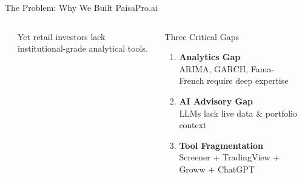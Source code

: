 \documentclass[aspectratio=169, 11pt]{beamer}
\begin{document}
\begin{frame}{The Problem: Why We Built PaisaPro.ai}
\begin{columns}[T]

\vspace{0.2cm}
\begin{center}
\end{center}

\vspace{0.3cm}
{\small Yet retail investors lack institutional-grade analytical tools.}

\begin{alertblock}{Three Critical Gaps}
\begin{enumerate}
  \item \textbf{Analytics Gap}\\
  {\scriptsize ARIMA, GARCH, Fama-French require deep expertise}
  \item \textbf{AI Advisory Gap}\\
  {\scriptsize LLMs lack live data \& portfolio context}
  \item \textbf{Tool Fragmentation}\\
  {\scriptsize Screener + TradingView + Groww + ChatGPT}
\end{enumerate}
\end{alertblock}

\vspace{0.1cm}
\begin{center}
\end{center}
\end{columns}
\end{frame}
\end{document}
